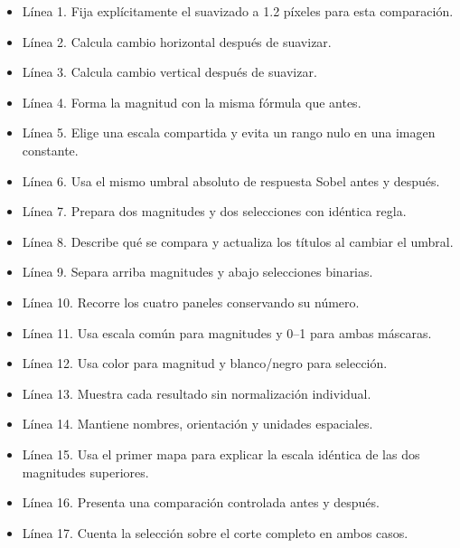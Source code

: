 
\begin{itemize}

\item Línea 1. Fija explícitamente el suavizado a 1.2 píxeles para esta comparación.

\item Línea 2. Calcula cambio horizontal después de suavizar.

\item Línea 3. Calcula cambio vertical después de suavizar.

\item Línea 4. Forma la magnitud con la misma fórmula que antes.

\item Línea 5. Elige una escala compartida y evita un rango nulo en una imagen constante.

\item Línea 6. Usa el mismo umbral absoluto de respuesta Sobel antes y después.

\item Línea 7. Prepara dos magnitudes y dos selecciones con idéntica regla.

\item Línea 8. Describe qué se compara y actualiza los títulos al cambiar el umbral.

\item Línea 9. Separa arriba magnitudes y abajo selecciones binarias.

\item Línea 10. Recorre los cuatro paneles conservando su número.

\item Línea 11. Usa escala común para magnitudes y 0–1 para ambas máscaras.

\item Línea 12. Usa color para magnitud y blanco/negro para selección.

\item Línea 13. Muestra cada resultado sin normalización individual.

\item Línea 14. Mantiene nombres, orientación y unidades espaciales.

\item Línea 15. Usa el primer mapa para explicar la escala idéntica de las dos magnitudes superiores.

\item Línea 16. Presenta una comparación controlada antes y después.

\item Línea 17. Cuenta la selección sobre el corte completo en ambos casos.

\end{itemize}

